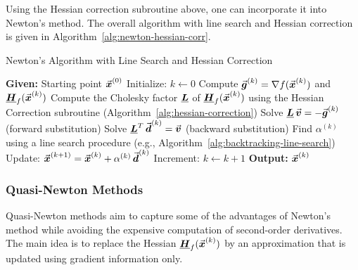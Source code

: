 Using the Hessian correction subroutine above, one can incorporate it into Newton's method. The overall algorithm with line search and Hessian correction is given in Algorithm~\ref{alg:newton-hessian-corr}.

\begin{algorithm}[h]
\caption{Newton's Algorithm with Line Search and Hessian Correction}\label{alg:newton-hessian-corr}
\begin{algorithmic}[1]
    \State \textbf{Given:} Starting point \(\vec{\boldsymbol{x}}^{(0)}\)
    \State Initialize: \(k \leftarrow 0\)
        \State Compute \(\vec{\boldsymbol{g}}^{(k)} = \nabla f(\vec{\boldsymbol{x}}^{(k)})\) and \(\underline{\boldsymbol{H}}_{f}(\vec{\boldsymbol{x}}^{(k)})\)
        \State Compute the Cholesky factor \(\underline{\boldsymbol{L}}\) of \(\underline{\boldsymbol{H}}_{f}(\vec{\boldsymbol{x}}^{(k)})\) using the Hessian Correction subroutine (Algorithm~\ref{alg:hessian-correction})
        \State Solve \(\underline{\boldsymbol{L}}\,\vec{\boldsymbol{v}} = -\vec{\boldsymbol{g}}^{(k)}\) (forward substitution) 
        \State Solve \(\underline{\boldsymbol{L}}^T\,\vec{\boldsymbol{d}}^{(k)} = \vec{\boldsymbol{v}}\) (backward substitution) 
        \State Find \(\alpha^{(k)}\) using a line search procedure (e.g., Algorithm~\ref{alg:backtracking-line-search})
        \State Update: \(\vec{\boldsymbol{x}}^{(k+1)} = \vec{\boldsymbol{x}}^{(k)} + \alpha^{(k)}\,\vec{\boldsymbol{d}}^{(k)}\) 
        \State Increment: \(k \leftarrow k + 1\)
    \EndWhile
    \State \textbf{Output:} \(\vec{\boldsymbol{x}}^{(k)}\) %
\end{algorithmic}
\end{algorithm}


\subsubsection{Quasi-Newton Methods}

Quasi-Newton methods aim to capture some of the advantages of Newton's method while avoiding the expensive computation of second-order derivatives. The main idea is to replace the Hessian \(\underline{\boldsymbol{H}}_{f}(\vec{\boldsymbol{x}}^{(k)})\) by an approximation that is updated using gradient information only.

